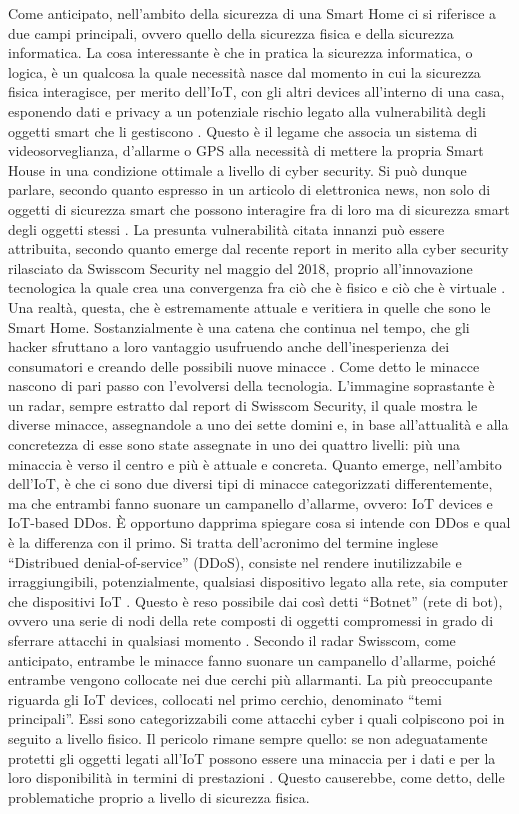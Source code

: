 Come anticipato, nell’ambito della sicurezza di una Smart Home ci si riferisce a due campi principali, ovvero quello della sicurezza fisica e della sicurezza informatica. La cosa interessante è che in pratica la sicurezza informatica, o logica, è un qualcosa la quale necessità nasce dal momento in cui la sicurezza fisica interagisce, per merito dell’IoT, con gli altri devices all’interno di una casa, esponendo dati e privacy a un potenziale rischio legato alla vulnerabilità degli oggetti smart che li gestiscono . Questo è il legame che associa un sistema di videosorveglianza, d’allarme o GPS alla necessità di mettere la propria Smart House in una condizione ottimale a livello di cyber security. Si può dunque parlare, secondo quanto espresso in un articolo di elettronica news, non solo di oggetti di sicurezza smart che possono interagire fra di loro ma di sicurezza smart degli oggetti stessi .
La presunta vulnerabilità citata innanzi può essere attribuita, secondo quanto emerge dal recente report in merito alla cyber security rilasciato da Swisscom Security nel maggio del 2018, proprio all’innovazione tecnologica la quale crea una convergenza fra ciò che è fisico e ciò che è virtuale . Una realtà, questa, che è estremamente attuale e veritiera in quelle che sono le Smart Home. Sostanzialmente è una catena che continua nel tempo, che gli hacker sfruttano a loro vantaggio usufruendo anche dell’inesperienza dei consumatori e creando delle possibili nuove minacce .
Come detto le minacce nascono di pari passo con l’evolversi della tecnologia. L’immagine soprastante è un radar, sempre estratto dal report di Swisscom Security, il quale mostra le diverse minacce, assegnandole a uno dei sette domini e, in base all’attualità e alla concretezza di esse sono state assegnate in uno dei quattro livelli: più una minaccia è verso il centro e più è attuale e concreta. 
Quanto emerge, nell’ambito dell’IoT, è che ci sono due diversi tipi di minacce categorizzati differentemente, ma che entrambi fanno suonare un campanello d’allarme, ovvero: IoT devices e IoT-based DDos. È opportuno dapprima spiegare cosa si intende con DDos e qual è la differenza con il primo. Si tratta dell’acronimo del termine inglese “Distribued denial-of-service” (DDoS), consiste nel rendere inutilizzabile e irraggiungibili, potenzialmente, qualsiasi dispositivo legato alla rete, sia computer che dispositivi IoT . Questo è reso possibile dai così detti “Botnet” (rete di bot), ovvero una serie di nodi della rete composti di oggetti compromessi in grado di sferrare attacchi in qualsiasi momento .
Secondo il radar Swisscom, come anticipato, entrambe le minacce fanno suonare un campanello d’allarme, poiché entrambe vengono collocate nei due cerchi più allarmanti. La più preoccupante riguarda gli IoT devices, collocati nel primo cerchio, denominato “temi principali”. Essi sono categorizzabili come attacchi cyber i quali colpiscono poi in seguito a livello fisico. Il pericolo rimane sempre quello: se non adeguatamente protetti gli oggetti legati all’IoT possono essere una minaccia per i dati e per la loro disponibilità in termini di prestazioni . Questo causerebbe, come detto, delle problematiche proprio a livello di sicurezza fisica. 
